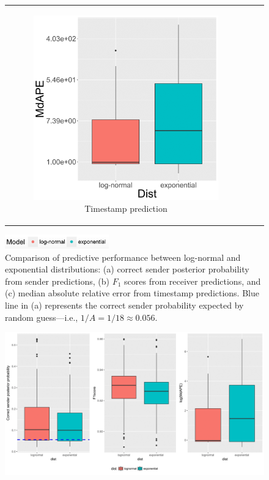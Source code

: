 \documentclass[ba]{imsart}
\numberwithin{equation}{section}
\theoremstyle{plain}
\begin{document}
\begin{figure}[!t]
\begin{tabular}[t]{ccc}
\begin{subfigure}[b]{0.33\textwidth}
			\end{subfigure}
			\begin{subfigure}[b]{0.33\textwidth}
				\caption{Timestamp prediction}
				\includegraphics[width=\textwidth]{img/timepredict-1.png}	
			\end{subfigure}
		\end{tabular}
		\includegraphics[width=0.4\textwidth]{img/modellabel.png}				
		\caption {Comparison of predictive performance between log-normal and exponential distributions: (a) correct sender posterior probability from sender predictions, (b) $F_1$ scores from receiver predictions, and (c) median absolute relative error from timestamp predictions. Blue line in (a) represents the correct sender probability expected by random guess---i.e., $1/A=1/18\approx0.056$.}
		\label{figure:PPEresults}
	\end{figure}		
	\iffalse
	\begin{figure}[!t]
		\centering
		\includegraphics[width=1\textwidth]{img/PPEplotnew-1.png}	
	\end{figure}
\end{document}
